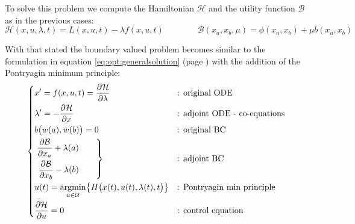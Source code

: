 To solve this problem we compute the Hamiltonian $\mathcal H$ and the utility function $\mathcal B$ as in the previous cases:
\[ \mathcal H (x,u, \lambda,t) = L(x,u,t) - \lambda f(x,u,t) \qquad \qquad \mathcal B (x_a,x_b,\mu) = \phi(x_a,x_b) + \mu b(x_a,x_b) \]

With that stated the boundary valued problem becomes similar to the formulation in equation \ref{eq:opt:generalsolution} (page \pageref{eq:opt:generalsolution}) with the addition of the Pontryagin minimum principle:
\begin{equation} 
	\left\{ \begin{aligned}
		& x' = f(x,u,t) = \frac{\partial \mathcal H}{\partial \lambda} && \textrm{: original ODE} \\
		&\lambda' = - \frac{\partial \mathcal H}{\partial x} && \textrm{: adjoint ODE - co-equations} \\
		&b\big(w(a),w(b)\big) = 0 && \textrm{: original BC} \\
		&\left. \begin{aligned}
			\frac{\partial \mathcal B}{\partial x_a} + \lambda(a) \\
			\frac{\partial \mathcal B}{\partial x_b} - \lambda(b)
		\end{aligned} \qquad \right\} &&\textrm{: adjoint BC} \\
		& u(t) = \underset{u \in \mathcal U}{\textrm{argmin}} \big\{ H\big(x(t), u(t),\lambda(t), t\big) \big\} && \textrm{: Pontryagin min principle} \\
		& \frac{\partial \mathcal H}{\partial u} = 0 && \textrm{: control equation}			
	\end{aligned} \right. 
\end{equation}



